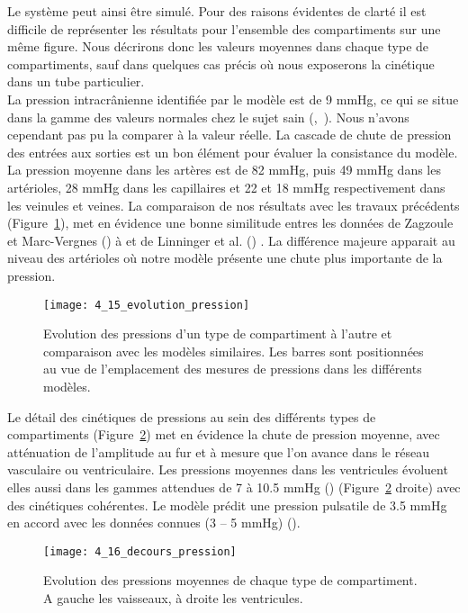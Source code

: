 Le système peut ainsi être simulé. Pour des raisons évidentes de clarté il est difficile de
représenter les résultats pour l’ensemble des compartiments sur une même figure. Nous décrirons
donc les valeurs moyennes dans chaque type de compartiments, sauf dans quelques cas précis où nous
exposerons la cinétique dans un tube particulier.\\
La pression intracrânienne identifiée par le modèle est de 9 mmHg, ce qui se situe dans la
gamme des valeurs normales chez le sujet sain (\cite{Steiner2006},~\cite{Pattinson2005}). Nous n’avons cependant pas pu la comparer
à la valeur réelle. La cascade de chute de pression des entrées aux sorties est un bon élément pour
évaluer la consistance du modèle. La pression moyenne dans les artères est de 82 mmHg, puis 49
mmHg dans les artérioles, 28 mmHg dans les capillaires et 22 et 18 mmHg respectivement dans les
veinules et veines. La comparaison de nos résultats avec les travaux précédents (Figure~\ref{fig:4_15_evolution_pression}), met en
évidence une bonne similitude entres les données de Zagzoule et Marc-Vergnes (\cite{Zagzoule1986}) à et de Linninger
et al. (\cite{Linninger2009}) . La différence majeure apparait au niveau des artérioles où notre modèle présente une chute
plus importante de la pression.\\
\begin{figure}[!t]
\centering
\texttt{[image: 4\_15\_evolution\_pression]}
\caption{Evolution des pressions d'un type de compartiment à l'autre et comparaison avec les modèles similaires. Les
barres sont positionnées au vue de l’emplacement des mesures de pressions dans les différents modèles.}
\label{fig:4_15_evolution_pression}	
\end{figure}
Le détail des cinétiques de pressions au sein des différents types de compartiments (Figure~\ref{fig:4_16_decours_pression})
met en évidence la chute de pression moyenne, avec atténuation de l’amplitude au fur et à mesure
que l’on avance dans le réseau vasculaire ou ventriculaire. Les pressions moyennes dans les ventricules
évoluent elles aussi dans les gammes attendues de 7 à 10.5 mmHg (\cite{Agamanolis2011}) (Figure~\ref{fig:4_16_decours_pression} droite) avec des
cinétiques cohérentes. Le modèle prédit une pression pulsatile de 3.5 mmHg en accord avec les
données connues (3 – 5 mmHg) (\cite{Czosnyka2005}).\\
\begin{figure}[!b]
\centering
\texttt{[image: 4\_16\_decours\_pression]}
\caption{Evolution des pressions moyennes de chaque type de compartiment. A gauche les vaisseaux, à droite les
ventricules.}
\label{fig:4_16_decours_pression}	
\end{figure}
